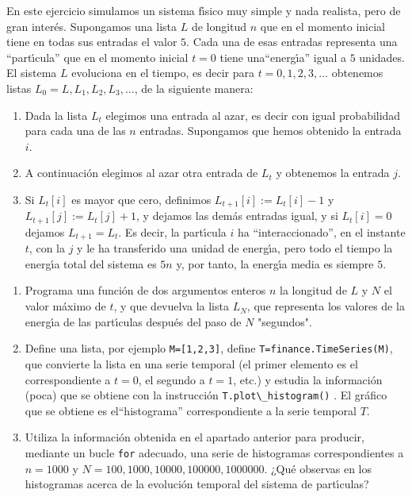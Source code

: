  En este ejercicio simulamos un sistema f\'{\i}sico muy simple y nada realista,
pero de gran
inter\'es. Supongamos una lista $L$ de longitud $n$ que en el momento inicial
tiene en todas sus entradas el valor $5$. Cada una de esas entradas representa
una ``part\'{\i}cula'' que en el momento inicial $t=0$ tiene una``energ\'{\i}a''
igual a $5$ unidades. El sistema $L$ evoluciona en el tiempo, es decir para
$t=0,1,2,3,\dots$  obtenemos listas $L_0=L,L_1,L_2,L_3,\dots$, de la siguiente
manera:
\begin{enumerate}
\item Dada la lista $L_t$ elegimos una entrada al azar, es decir con igual
probabilidad para cada una de las $n$ entradas. Supongamos que hemos obtenido la
entrada $i$.
\item A continuación elegimos al azar otra entrada de $L_t$ y obtenemos la
entrada $j$.
 \item Si $L_t[i]$ es mayor que cero, definimos  $L_{t+1}[i]:=L_t[i]-1$ y
$L_{t+1}[j]:= L_t[j]+1$, y dejamos las demás entradas igual, y si $L_t[i]=0$
dejamos $L_{t+1}=L_{t}$.   Es decir, la part\'{\i}cula $i$ ha
``interaccionado'', en el instante $t$, con la $j$ y le ha transferido una
unidad de energ\'{\i}a, pero todo el tiempo  la energ\'{\i}a total del sistema
es  $5n$ y, por tanto,  la energ\'{\i}a media es siempre $5$.

\end{enumerate}
\begin{ejer}

\begin{enumerate}

\item Programa una funci\'on de dos argumentos enteros $n$ la longitud de $L$ y
$N$ el valor m\'aximo de $t$,  y que devuelva la lista $L_N$, que representa los
valores de la energ\'{\i}a de las part\'{\i}culas después del paso de $N$
"segundos".
 \item Define una lista, por ejemplo {\tt M=[1,2,3]}, define 
 \lstinline|T=finance.TimeSeries(M)|, que convierte la lista en una serie
temporal (el
primer elemento es el correspondiente a $t=0$, el segundo a $t=1$, etc.)  y
estudia   la informaci\'on (poca) que se obtiene con la instrucci\'on  
\lstinline|T.plot\_histogram()| . El gr\'afico que se obtiene es
el``histograma''
correspondiente a la serie temporal $T$. 
 \item Utiliza la informaci\'on obtenida en el apartado anterior para producir,
mediante
un bucle \lstinline|for|  adecuado,  una serie de histogramas  correspondientes
a $n=1000$ y
$N=100,1000,10000,100000,1000000$. ¿Qu\'e observas en los histogramas acerca de
la evoluci\'on temporal del sistema de part\'{\i}culas?
\end{enumerate}
 \end{ejer}
 
